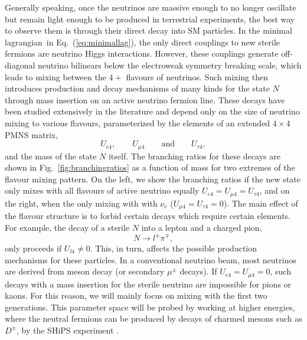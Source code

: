 \documentclass[11pt, a4paper]{article}
\newcommand{\refeq}[1]{Eq.~(\ref{#1})}
\newcommand{\reffig}[1]{Fig.~\ref{#1}}
\def\lagrangian{lagrangian}
\begin{document}
Generally speaking, once the neutrinos are massive enough to no longer
oscillate but remain light enough to be produced in terrestrial experiments,
the best way to observe them is through their direct decay into SM particles.
In the minimal \lagrangian\ in \refeq{eq:minimallag}, the only direct couplings
to new sterile fermions are neutrino Higgs interactions. However, these
couplings generate off-diagonal neutrino bilinears below the electroweak
symmetry breaking scale, which leads to mixing between the $4+$ flavours of
neutrinos. Such mixing then introduces production and decay mechanisms of many
kinds for the state $N$ through mass insertion on an active neutrino fermion
line. These decays have been studied extensively in the literature
\cite{Atre} and depend only on the size of neutrino mixing to various
flavours, parameterized by the elements of an extended $4\times4$ PMNS matrix,
%
\[ U_{e4}, \qquad U_{\mu 4} \qquad \text{and} \qquad U_{\tau 4},  \]
%
and the mass of the state $N$ itself. The branching ratios for these decays are
shown in \reffig{fig:branchingratios} as a function of mass for two extremes of
the flavour mixing pattern. On the left, we show the branching ratios if the
new state only mixes with all flavours of active neutrino equally
$U_{e4}=U_{\mu 4}=U_{\tau 4}$, and on the right, when the only mixing with with
$\nu_e$ ($U_{\mu 4}=U_{\tau 4} = 0$). The main effect of the flavour structure
is to forbid certain decays which require certain elements. For example, the
decay of a sterile $N$ into a lepton and a charged pion,
%
\[ N \to l^\pm \pi^\mp,   \]
%
only proceeds if $U_{l4}\neq 0$. This, in turn, affects the possible production
mechanisms for these particles. In a conventional neutrino beam, most neutrinos
are derived from meson decay (or secondary $\mu^\pm$ decays). If $U_{e4}=U_{\mu
4}=0$, such decays with a mass insertion for the sterile neutrino are
impossible for pions or kaons. For this reason, we will mainly focus on mixing
with the first two generations. This parameter space will be probed by working
at higher energies, where the neutral fermions can be produced by decays of
charmed mesons such as $D^\pm$, by the SHiPS experiment \cite{}.
 
\end{document}
